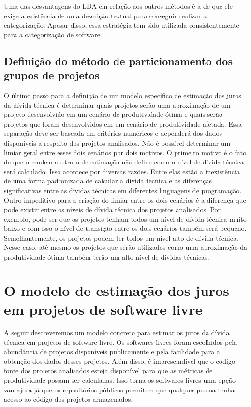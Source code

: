 Uma das desvantagens do LDA em relação aos outros métodos é a de que ele exige a existência de uma descrição textual para conseguir realizar a categorização. Apesar disso, essa estratégia tem sido utilizada consistentemente para a categorização de software\cite{chen2012explaining,tian2009using,maskeri2008mining,kelly2011recovering} 


 



\subsection{Definição do método de particionamento dos grupos de projetos}


 O último passo para a definição de um modelo específico de estimação dos juros da dívida técnica é determinar quais projetos serão uma aproximação de um projeto desenvolvido em um cenário de produtividade ótima e quais serão projetos que foram desenvolvidos em um cenário de produtividade afetada. Essa separação deve ser baseada em critérios numéricos e dependerá dos dados disponíveis a respeito dos projetos analisados.  Não é possível determinar um limiar geral entre esses dois cenários por dois motivos. O primeiro motivo é o fato de que o modelo abstrato de estimação não define como o nível de dívida técnica será calculado. Isso acontece por diversas razões. Entre elas estão a inexistência de uma forma padronizada de calcular a dívida técnica e as diferenças significativas entre as dívidas técnicas em diferentes linguagens de programação. Outro impeditivo para a criação do limiar entre os dois cenários é a diferença que pode existir entre os níveis de dívida técnica dos projetos analisados. Por exemplo, pode ser que os projetos tenham todos um nível de dívida técnica muito baixo e com isso o nível de transição entre os dois cenários também será pequeno. Semelhantemente, os projetos podem ter todos um nível alto de dívida técnica. Nesse caso, até mesmo os projetos que serão utilizados como uma aproximação da produtividade ótima também terão um alto nível de dívidas técnicas.
 
 
 
\section{O modelo de estimação dos juros em projetos de software livre}

 A seguir descreveremos um modelo concreto para estimar os juros da dívida técnica em projetos de software livre. Os softwares livres foram escolhidos pela abundância de projetos disponíveis publicamente e pela facilidade para a obtenção dos dados desses projetos. Além disso, é imprescindível que o código fonte dos projetos analisados esteja disponível para que as métricas de produtividade possam ser calculadas. Isso torna os softwares livres uma opção vantajosa já que os repositórios públicos permitem que qualquer pessoa tenha acesso ao código dos  projetos armazenados. 
 
